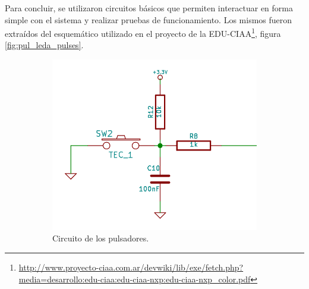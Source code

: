 Para concluir, se utilizaron circuitos básicos que permiten interactuar en forma simple con el sistema y realizar pruebas de funcionamiento.
Los mismos fueron extraídos del esquemático utilizado en el proyecto de la EDU-CIAA\footnote{\url{http://www.proyecto-ciaa.com.ar/devwiki/lib/exe/fetch.php?media=desarrollo:edu-ciaa:edu-ciaa-nxp:edu-ciaa-nxp\_color.pdf}}, figura \ref{fig:pul_leda_pulses}.


\begin{figure}[!hp]
  \begin{subfigure}{0.4\textwidth}
    \centering
    \includegraphics[width=1\linewidth]{./Figures/pulse_sch.png}
    \caption{Circuito de los pulsadores.}
  \end{subfigure}%
  \hfill
  \begin{subfigure}{0.4\textwidth}
    \centering

\end{subfigure}
\end{figure}
